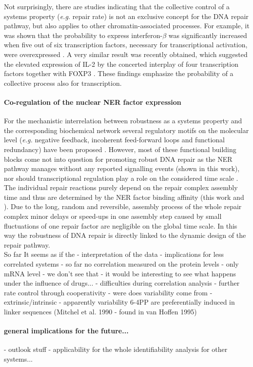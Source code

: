 Not surprisingly, there are studies indicating that the collective control of a systems property (\textit{e.g.} repair rate) is not an exclusive concept for the DNA repair pathway, but also applies to other chromatin-associated processes. For example, it was shown that the probability to express interferon-$\beta$ was significantly increased when five out of six transcription factors, necessary for transcriptional activation, were overexpressed \cite{Apostolou2008}. A very similar result was recently obtained, which suggested the elevated expression of IL-2 by the concerted interplay of four transcription factors together with FOXP3 \cite{Bendfeldt2012}. These findings emphasize the probability of a collective process also for transcription.   



\paragraph{Co-regulation of the nuclear NER factor expression}
For the mechanistic interrelation between robustness as a systems property and the corresponding biochemical network several regulatory motifs on the molecular level (\textit{e.g.} negative feedback, incoherent feed-forward loops and functional redundancy) have been proposed \cite{Alon2007,Bleris2011,Yi2000,Manuscript2011}. However, most of these functional building blocks come not into question for promoting robust DNA repair as the NER pathway manages without any reported signalling events (shown in this work), nor should transcriptional regulation play a role on the considered time scale \cite{Mone2001}. The individual repair reactions purely depend on the repair complex assembly time and thus are determined by the NER factor binding affinity (this work and \cite{Luijsterburg2010}). Due to the long, random and reversible, assembly process of the whole repair complex minor delays or speed-ups in one assembly step caused by small fluctuations of one repair factor are negligible on the global time scale. In this way the robustness of DNA repair is directly linked to the dynamic design of the repair pathway.\\     


So far 
It seems as if the 
- interpretation of the data
- implications for less correlated systems
- so far no correlation measured on the protein levels 
- only mRNA level - we don't see that
- it would be interesting to see what happens under the influence of drugs...
- difficulties during correlation analysis
- further rate control through cooperativity 
- were does variability come from - extrinsic/intrinsic
- apparently variability 6-4PP are preferentially induced in linker sequences (Mitchel et al. 1990 - found in van Hoffen 1995)

\paragraph{general implications for the future...}
- outlook stuff 
- applicability for the whole identifiability analysis for other systems...
